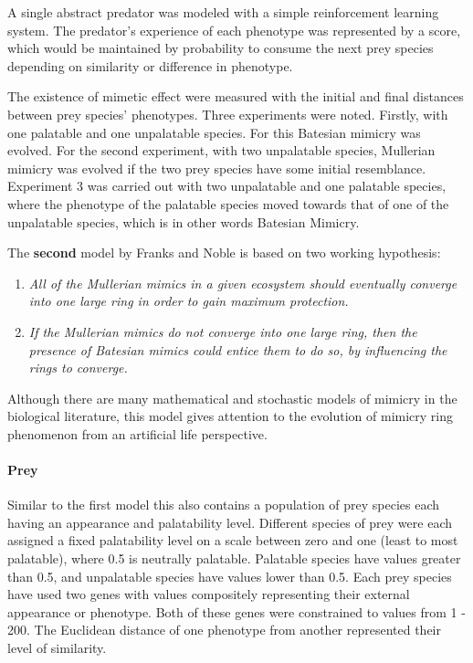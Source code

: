 A single abstract predator was modeled with a simple reinforcement learning system. The predator's experience of each phenotype was represented by a score, which would be maintained by probability to consume the next prey species depending on similarity or difference in phenotype. 

The existence of mimetic effect were measured with the initial and final distances between prey species' phenotypes. Three experiments were noted. Firstly, with one palatable and one unpalatable species. For this Batesian mimicry was evolved. For the second experiment, with two unpalatable species, Mullerian mimicry was evolved if the two prey species have some initial resemblance. Experiment 3 was carried out with two unpalatable and one palatable species, where the phenotype of the palatable species moved towards that of one of the unpalatable species, which is in other words Batesian Mimicry.

The \textbf{second} model by Franks and Noble \cite{franks2003} is based on two working hypothesis:

\begin{enumerate}
	\item \textsl{All of the Mullerian mimics in a given ecosystem should eventually converge into one large ring in order to gain maximum protection.}
	\item \textsl{If the Mullerian mimics do not converge into one large ring, then the presence of Batesian mimics could entice them to do so, by influencing the rings to converge.}
\end{enumerate}

Although there are many mathematical and stochastic models of mimicry in the biological literature, this model gives attention to the evolution of mimicry ring phenomenon from an artificial life perspective.

\paragraph{Prey}
Similar to the first model this also contains a population of prey species each having an appearance and palatability level. Different species of prey were each assigned a fixed palatability level on a scale between zero and one (least to most palatable), where 0.5 is neutrally palatable. Palatable species have values greater than 0.5, and unpalatable species have values lower than 0.5. Each prey species have used two genes with values compositely representing their external appearance or phenotype. Both of these genes were constrained to values from 1 - 200. The Euclidean distance of one phenotype from another represented their level of similarity.

